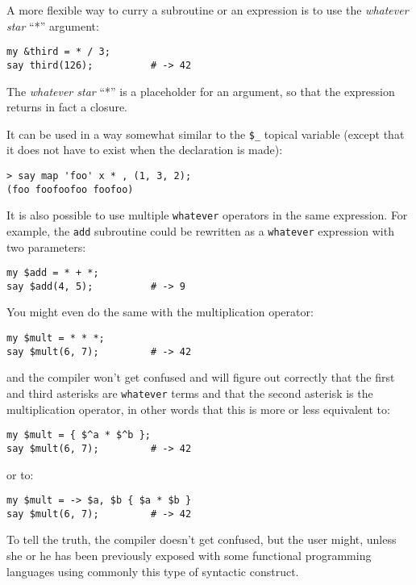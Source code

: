 A more flexible way to curry a subroutine or an expression 
is to use the \emph{whatever star} ``*'' argument:

\begin{verbatim}
my &third = * / 3; 
say third(126);          # -> 42
\end{verbatim}

The \emph{whatever star} ``*'' is a placeholder for 
an argument, so that the expression returns in fact 
a closure.

It can be used in a way somewhat similar to the \verb'$_' 
topical variable (except that it does not have to exist 
when the declaration is made):

\begin{verbatim}
> say map 'foo' x * , (1, 3, 2);
(foo foofoofoo foofoo)
\end{verbatim}

It is also possible to use multiple {\tt whatever} operators 
in the same expression. For example, the {\tt add} 
subroutine could be rewritten as a {\tt whatever} 
expression with two parameters:

\begin{verbatim}
my $add = * + *;
say $add(4, 5);          # -> 9
\end{verbatim}

You might even do the same with the multiplication operator:

\begin{verbatim}
my $mult = * * *;
say $mult(6, 7);         # -> 42
\end{verbatim}

and the compiler won't get confused and will figure out 
correctly that the first and third asterisks are 
\verb'whatever' terms and that the second asterisk is 
the multiplication operator, in other words that this is 
more or less equivalent to:

\begin{verbatim}
my $mult = { $^a * $^b };
say $mult(6, 7);         # -> 42
\end{verbatim}

or to:

\begin{verbatim}
my $mult = -> $a, $b { $a * $b }
say $mult(6, 7);         # -> 42  
\end{verbatim}

To tell the truth, the compiler doesn't get confused, 
but the user might, unless she or he has been previously 
exposed with some functional programming languages using 
commonly this type of syntactic construct. 

